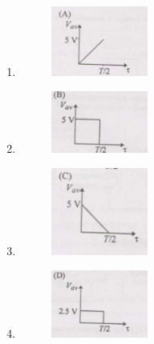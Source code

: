\documentclass[journal]{IEEEtran}
\begin{document}
\begin{enumerate}
\begin{enumerate}
\item \begin{figure}[H]
      \includegraphics[width=0.3\textwidth]{16.jpg} 
      \caption{}
    \label{fig:fig16} 
\end{figure}
\item \begin{figure}[H]
      \includegraphics[width=0.3\textwidth]{17.jpg} 
      \caption{}
    \label{fig:fig17} 
\end{figure}
\item \begin{figure}[H]
      \includegraphics[width=0.3\textwidth]{18.jpg} 
      \caption{}
    \label{fig:fig18} 
\end{figure}
\item  \begin{figure}[H]
      \includegraphics[width=0.3\textwidth]{19.jpg} 
      \caption{}
    \label{fig:fig19} 
\end{figure}
\end{enumerate}


\end{enumerate}
\end{document}
